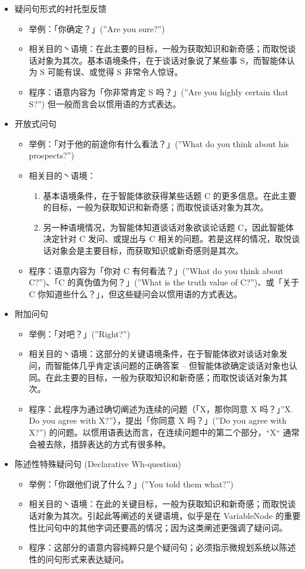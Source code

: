 \begin{itemize}
\item 疑问句形式的衬托型反馈
\begin{itemize}
\item 举例：「你确定？」(”Are you sure?”)
\item 相关目的丶语境：在此主要的目标，一般为获取知识和新奇感；而取悦谈话对象为其次。基本语境条件，在于谈话对象说了某些事 S，而智能体认为 S 可能有误、或觉得 S 非常令人惊讶。
\item 程序：语意内容为「你非常肯定 S 吗？」(”Are you highly certain that S?”) 但一般而言会以惯用语的方式表达。
\end{itemize}


\item 开放式问句
\begin{itemize}
\item 举例：「对于他的前途你有什么看法？」(”What do you think about his prospects?”)
\item 相关目的丶语境：
\begin{enumerate}
\item 基本语境条件，在于智能体欲获得某些话题 C 的更多信息。在此主要的目标，一般为获取知识和新奇感；而取悦谈话对象为其次。
\item 另一种语境情况，为智能体知道谈话对象欲谈论话题 C，因此智能体决定针对 C 发问、或提出与 C 相关的问题。若是这样的情况，取悦谈话对象会是主要目标，而获取知识或新奇感则是其次。 
\end{enumerate}
\item 程序：语意内容为「你对 C 有何看法？」(”What do you think about C?”)、「C 的真伪值为何？」(”What is the truth value of C?”)、或「关于 C 你知道些什么？」，但这些疑问会以惯用语的方式表达。
\end{itemize}


\item 附加问句
\begin{itemize}
\item 举例：「对吧？」(”Right?”)
\item 相关目的丶语境：这部分的关键语境条件，在于智能体欲对谈话对象发问，而智能体几乎肯定该问题的正确答案 – 但智能体欲确定谈话对象也认同。在此主要的目标，一般为获取知识和新奇感；而取悦谈话对象为其次。 
\item 程序：此程序为通过确切阐述为连续的问题（「X，那你同意 X 吗？」”X. Do you agree with X?”），提出「你同意 X 吗？」(”Do you agree with X?”) 的问题。以惯用语表达而言，在连续问题中的第二个部分，“X“ 通常会被去除，措辞表达的方式有很多种。
\end{itemize}


\item 陈述性特殊疑问句 (Declarative Wh-question)
\begin{itemize}
\item 举例：「你跟他们说了什么？」(”You told them what?”)
\item 相关目的丶语境：在此的关键目标，一般为获取知识和新奇感；而取悦谈话对象为其次。引起此等阐述的关键语境，似乎是在 VariableNode 的重要性比问句中的其他字词还要高的情况；因为这类阐述更强调了疑问词。
\item 程序：这部分的语意内容纯粹只是个疑问句；必须指示微规划系统以陈述性的问句形式来表达疑问。
\end{itemize}



\end{itemize}
